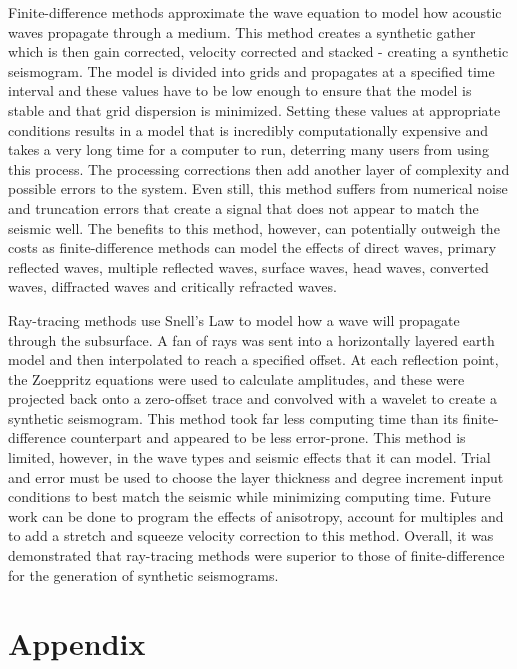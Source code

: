 \documentclass[12pt]{article}
\begin{document}
	Finite-difference methods approximate the wave equation to model how acoustic waves propagate through a medium. This method creates a synthetic gather which is then gain corrected, velocity corrected and stacked - creating a synthetic seismogram. The model is divided into grids and propagates at a specified time interval and these values have to be low enough to ensure that the model is stable and that grid dispersion is minimized. Setting these values at appropriate conditions results in a model that is incredibly computationally expensive and takes a very long time for a computer to run, deterring many users from using this process. The processing corrections then add another layer of complexity and possible errors to the system. Even still, this method suffers from numerical noise and truncation errors that create a signal that does not appear to match the seismic well. The benefits to this method, however, can potentially outweigh the costs as finite-difference methods can model the effects of direct waves, primary reflected waves, multiple reflected waves, surface waves, head waves, converted waves, diffracted waves and critically refracted waves. 
	
	Ray-tracing methods use Snell's Law to model how a wave will propagate through the subsurface. A fan of rays was sent into a horizontally layered earth model and then interpolated to reach a specified offset. At each reflection point, the Zoeppritz equations were used to calculate amplitudes, and these were projected back onto a zero-offset trace and convolved with a wavelet to create a synthetic seismogram. This method took far less computing time than its finite-difference counterpart and appeared to be less error-prone. This method is limited, however, in the wave types and seismic effects that it can model. Trial and error must be used to choose the layer thickness and degree increment input conditions to best match the seismic while minimizing computing time. Future work can be done to program the effects of anisotropy, account for multiples and to add a stretch and squeeze velocity correction to this method. Overall, it was demonstrated that ray-tracing methods were superior to those of finite-difference for the generation of synthetic seismograms. 


\pagebreak


\pagebreak

\section{Appendix}
\renewcommand\thefigure{A.\arabic{figure}}  
\setcounter{figure}{0}
\end{document}
